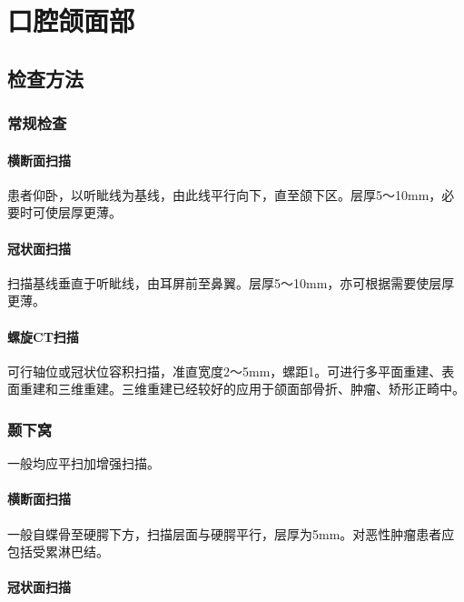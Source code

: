 \chapter{口腔颌面部}

\section{检查方法}

\subsection{常规检查}

\subsubsection{横断面扫描}

患者仰卧，以听眦线为基线，由此线平行向下，直至颌下区。层厚5～10mm，必要时可使层厚更薄。

\subsubsection{冠状面扫描}

扫描基线垂直于听眦线，由耳屏前至鼻翼。层厚5～10mm，亦可根据需要使层厚更薄。

\subsubsection{螺旋CT扫描}

可行轴位或冠状位容积扫描，准直宽度2～5mm，螺距1。可进行多平面重建、表面重建和三维重建。三维重建已经较好的应用于颌面部骨折、肿瘤、矫形正畸中。

\subsection{颞下窝}

一般均应平扫加增强扫描。

\subsubsection{横断面扫描}

一般自蝶骨至硬腭下方，扫描层面与硬腭平行，层厚为5mm。对恶性肿瘤患者应包括受累淋巴结。

\subsubsection{冠状面扫描}

